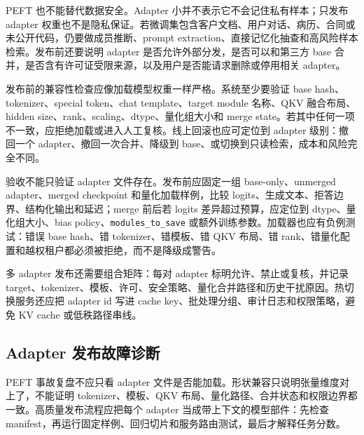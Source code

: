 \documentclass[UTF8,zihao=-4,openany]{ctexbook}
\begin{document}
PEFT 也不能替代数据安全。Adapter 小并不表示它不会记住私有样本；只发布 adapter 权重也不是隐私保证。若微调集包含客户文档、用户对话、病历、合同或未公开代码，仍要做成员推断、prompt extraction、直接记忆化抽查和高风险样本检索。发布前还要说明 adapter 是否允许外部分发，是否可以和第三方 base 合并，是否含有许可证受限来源，以及用户是否能请求删除或停用相关 adapter。

发布前的兼容性检查应像加载模型权重一样严格。系统至少要验证 base hash、tokenizer、special token、chat template、target module 名称、QKV 融合布局、hidden size、rank、scaling、dtype、量化组大小和 merge state。若其中任何一项不一致，应拒绝加载或进入人工复核。线上回滚也应可定位到 adapter 级别：撤回一个 adapter、撤回一次合并、降级到 base、或切换到只读检索，成本和风险完全不同。

验收不能只验证 adapter 文件存在。发布前应固定一组 base-only、unmerged adapter、merged checkpoint 和量化加载样例，比较 logits、生成文本、拒答边界、结构化输出和延迟；merge 前后若 logits 差异超过预算，应定位到 dtype、量化组大小、bias policy、\texttt{modules\_to\_save} 或额外训练参数。加载器也应有负例测试：错误 base hash、错 tokenizer、错模板、错 QKV 布局、错 rank、错量化配置和越权租户都必须被拒绝，而不是降级成警告。

多 adapter 发布还需要组合矩阵：每对 adapter 标明允许、禁止或复核，并记录 target、tokenizer、模板、许可、安全策略、量化合并路径和历史干扰原因。热切换服务还应把 adapter id 写进 cache key、批处理分组、审计日志和权限策略，避免 KV cache 或低秩路径串线。

\subsection{Adapter 发布故障诊断}
PEFT 事故复盘不应只看 adapter 文件是否能加载。形状兼容只说明张量维度对上了，不能证明 tokenizer、模板、QKV 布局、量化路径、合并状态和权限边界都一致。高质量发布流程应把每个 adapter 当成带上下文的模型部件：先检查 manifest，再运行固定样例、回归切片和服务路由测试，最后才解释任务分数。
\end{document}
